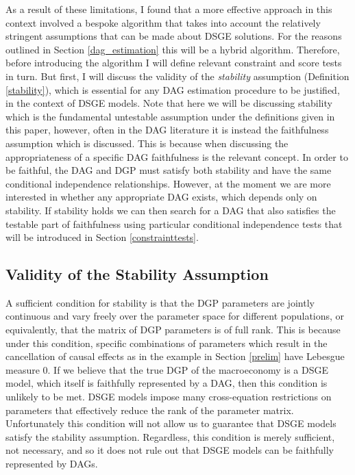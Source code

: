 \documentclass{article}
\begin{document}
As a result of these limitations, I found that a more effective approach in this context involved a bespoke algorithm that takes into account the relatively stringent assumptions that can be made about DSGE solutions. For the reasons outlined in Section \ref{dag_estimation} this will be a hybrid algorithm. Therefore, before introducing the algorithm I will define relevant constraint and score tests in turn. But first, I will discuss the validity of the \textit{stability} assumption (Definition \ref{stability}), which is essential for any DAG estimation procedure to be justified, in the context of DSGE models. Note that here we will be discussing stability which is the fundamental untestable assumption under the definitions given in this paper, however, often in the DAG literature it is instead the faithfulness assumption which is discussed. This is because when discussing the appropriateness of a specific DAG faithfulness is the relevant concept. In order to be faithful, the DAG and DGP must satisfy both stability and have the same conditional independence relationships. However, at the moment we are more interested in whether any appropriate DAG exists, which depends only on stability. If stability holds we can then search for a DAG that also satisfies the testable part of faithfulness using particular conditional independence tests that will be introduced in Section \ref{constrainttests}.

\subsection{Validity of the Stability Assumption}

A sufficient condition for stability is that the DGP parameters are jointly continuous and vary freely over the parameter space \parencite{steel2006homogeneity} for different populations, or equivalently, that the matrix of DGP parameters is of full rank. This is because under this condition, specific combinations of parameters which result in the cancellation of causal effects as in the example in Section \ref{prelim} have Lebesgue measure 0. If we believe that the true DGP of the macroeconomy is a DSGE model, which itself is faithfully represented by a DAG, then this condition is unlikely to be met. DSGE models impose many cross-equation restrictions on parameters that effectively reduce the rank of the parameter matrix. Unfortunately this condition will not allow us to guarantee that DSGE models satisfy the stability assumption. Regardless, this condition is merely sufficient, not necessary, and so it does not rule out that DSGE models can be faithfully represented by DAGs. 
\end{document}
